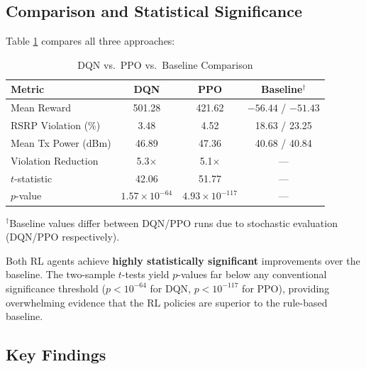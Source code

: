 \documentclass[conference]{IEEEtran}
\begin{document}
\subsection{Comparison and Statistical Significance}

Table \ref{tab:comparison} compares all three approaches:

\begin{table}[t]
\centering
\caption{DQN vs.\ PPO vs.\ Baseline Comparison}
\label{tab:comparison}
\scriptsize
\begin{tabular}{@{}lccc@{}}
\toprule
\textbf{Metric} & \textbf{DQN} & \textbf{PPO} & \textbf{Baseline$^\dagger$} \\
\midrule
Mean Reward & 501.28 & 421.62 & $-56.44$ / $-51.43$ \\
RSRP Violation (\%) & 3.48 & 4.52 & 18.63 / 23.25 \\
Mean Tx Power (dBm) & 46.89 & 47.36 & 40.68 / 40.84 \\
Violation Reduction & 5.3$\times$ & 5.1$\times$ & --- \\
\midrule
$t$-statistic & 42.06 & 51.77 & --- \\
$p$-value & $1.57 \times 10^{-64}$ & $4.93 \times 10^{-117}$ & --- \\
\bottomrule
\end{tabular}
\end{table}

{\footnotesize $^\dagger$Baseline values differ between DQN/PPO runs due to stochastic evaluation (DQN/PPO respectively).}

Both RL agents achieve \textbf{highly statistically significant} improvements over the baseline. The two-sample $t$-tests yield $p$-values far below any conventional significance threshold ($p < 10^{-64}$ for DQN, $p < 10^{-117}$ for PPO), providing overwhelming evidence that the RL policies are superior to the rule-based baseline.

\subsection{Key Findings}
\end{document}
